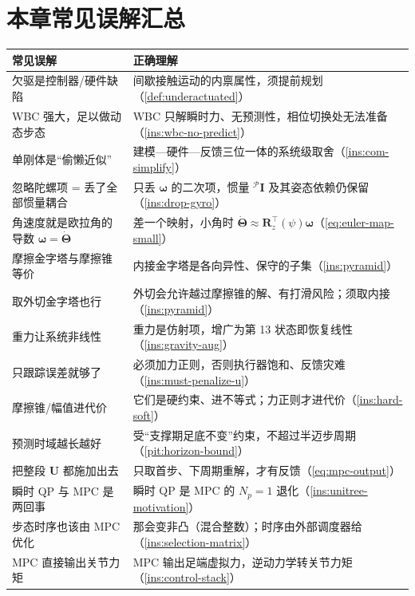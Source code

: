 \section*{本章常见误解汇总}
\begin{table}[H]\centering\small
\begin{tabular}{p{} p{}}
\toprule
\textbf{常见误解} & \textbf{正确理解} \\
\midrule
欠驱是控制器/硬件缺陷 & 间歇接触运动的内禀属性，须提前规划（\cref{def:underactuated}）\\
WBC 强大，足以做动态步态 & WBC 只解瞬时力、无预测性，相位切换处无法准备（\cref{ins:wbc-no-predict}）\\
单刚体是“偷懒近似” & 建模—硬件—反馈三位一体的系统级取舍（\cref{ins:com-simplify}）\\
忽略陀螺项 = 丢了全部惯量耦合 & 只丢 $\boldsymbol{\omega}$ 的二次项，惯量 ${}^{\mathcal{P}}\mathbf{I}$ 及其姿态依赖仍保留（\cref{ins:drop-gyro}）\\
角速度就是欧拉角的导数 $\boldsymbol{\omega}=\dot{\boldsymbol{\Theta}}$ & 差一个映射，小角时 $\dot{\boldsymbol{\Theta}}\approx\mathbf{R}_z^\top(\psi)\boldsymbol{\omega}$（\cref{eq:euler-map-small}）\\
摩擦金字塔与摩擦锥等价 & 内接金字塔是各向异性、保守的子集（\cref{ins:pyramid}）\\
取外切金字塔也行 & 外切会允许越过摩擦锥的解、有打滑风险；须取内接（\cref{ins:pyramid}）\\
重力让系统非线性 & 重力是仿射项，增广为第 13 状态即恢复线性（\cref{ins:gravity-aug}）\\
只跟踪误差就够了 & 必须加力正则，否则执行器饱和、反馈灾难（\cref{ins:must-penalize-u}）\\
摩擦锥/幅值进代价 & 它们是硬约束、进不等式；力正则才进代价（\cref{ins:hard-soft}）\\
预测时域越长越好 & 受“支撑期足底不变”约束，不超过半迈步周期（\cref{pit:horizon-bound}）\\
把整段 $\mathbf{U}$ 都施加出去 & 只取首步、下周期重解，才有反馈（\cref{eq:mpc-output}）\\
瞬时 QP 与 MPC 是两回事 & 瞬时 QP 是 MPC 的 $N_p=1$ 退化（\cref{ins:unitree-motivation}）\\
步态时序也该由 MPC 优化 & 那会变非凸（混合整数）；时序由外部调度器给（\cref{ins:selection-matrix}）\\
MPC 直接输出关节力矩 & MPC 输出足端虚拟力，逆动力学转关节力矩（\cref{ins:control-stack}）\\
\bottomrule
\end{tabular}
\end{table}

